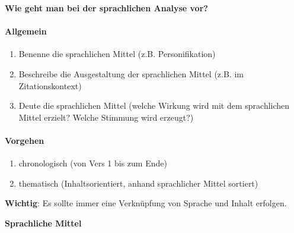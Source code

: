 \documentclass[12pt,a4paper]{report}
\begin{document}
	\clearpage
	\thispagestyle{empty}

	\Large \textbf{Wie geht man bei der sprachlichen Analyse vor?}
	
	\vspace{1.5cm}
	\large
	\paragraph{Allgemein}
	\begin{enumerate}
		\item Benenne die sprachlichen Mittel (z.B. Personifikation)
		\item Beschreibe die Ausgestaltung der sprachlichen Mittel (z.B. im Zitationskontext)
		\item Deute die sprachlichen Mittel (welche Wirkung wird mit dem sprachlichen Mittel erzielt? Welche Stimmung wird erzeugt?)
	\end{enumerate}
	
	\paragraph{Vorgehen}
	\begin{enumerate}
		\item chronologisch (von Vers 1 bis zum Ende)
		\item thematisch (Inhaltsorientiert, anhand sprachlicher Mittel sortiert)
	\end{enumerate}
	\vspace{1cm}
	\textbf{Wichtig}: Es sollte immer eine Verknüpfung von Sprache und Inhalt erfolgen.
	
	\newpage
	\clearpage
	\thispagestyle{empty}
	\Large\textbf{Sprachliche Mittel}
	\vspace{1cm}
	\large	
\end{document}
